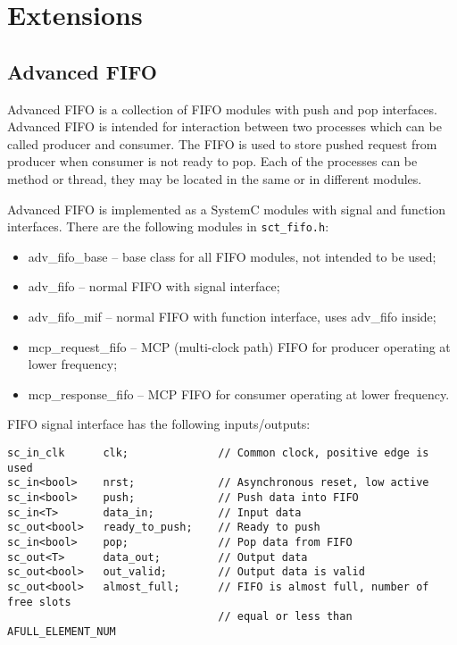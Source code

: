 \section{Extensions}\label{section:extensions}

\ifdefined\INTEL
 
\fi

\subsection{Advanced FIFO}\label{section:adv_fifo}

Advanced FIFO is a collection of FIFO modules with push and pop interfaces. Advanced FIFO is intended for interaction between two processes which can be called producer and consumer. The FIFO is used to store pushed request from producer when consumer is not ready to pop. Each of the processes can be method or thread, they may be located in the same or in different modules.

Advanced FIFO is implemented as a SystemC modules with signal and function interfaces. There are the following modules in {\tt sct\_fifo.h}:

\begin{itemize}
\item adv\_fifo\_base -- base class for all FIFO modules, not intended to be used;
\item adv\_fifo -- normal FIFO with signal interface;
\item adv\_fifo\_mif -- normal FIFO with function interface, uses adv\_fifo inside;
\item mcp\_request\_fifo -- MCP (multi-clock path) FIFO for producer operating at lower frequency; 
\item mcp\_response\_fifo -- MCP FIFO for consumer operating at lower frequency.
\end{itemize}

FIFO signal interface has the following inputs/outputs:
%
\begin{lstlisting}[style=mycpp]
sc_in_clk      clk;              // Common clock, positive edge is used
sc_in<bool>    nrst;             // Asynchronous reset, low active
sc_in<bool>    push;             // Push data into FIFO
sc_in<T>       data_in;          // Input data
sc_out<bool>   ready_to_push;    // Ready to push
sc_in<bool>    pop;              // Pop data from FIFO
sc_out<T>      data_out;         // Output data
sc_out<bool>   out_valid;        // Output data is valid 
sc_out<bool>   almost_full;      // FIFO is almost full, number of free slots 
                                 // equal or less than AFULL_ELEMENT_NUM 
\end{lstlisting}

